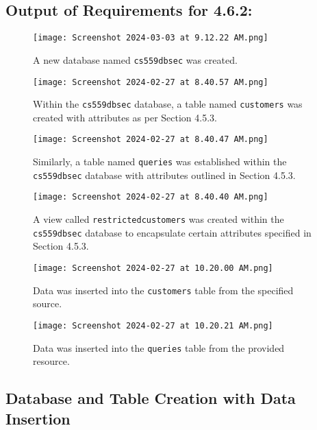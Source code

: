 \documentclass{article}
\begin{document}
\subsection*{Output of Requirements for 4.6.2:}

\begin{figure}[H]
    \centering
    \texttt{[image: Screenshot 2024-03-03 at 9.12.22 AM.png]}
    \caption{A new database named  \texttt{cs559dbsec} was created.}
\end{figure}

\begin{figure}[H]
    \centering
    \texttt{[image: Screenshot 2024-02-27 at 8.40.57 AM.png]}
    \caption{Within the \texttt{cs559dbsec} database, a table named \texttt{customers} was created with attributes as per Section 4.5.3.}
\end{figure}

\begin{figure}[H]
    \centering
    \texttt{[image: Screenshot 2024-02-27 at 8.40.47 AM.png]}
    \caption{Similarly, a table named \texttt{queries} was established within the \texttt{cs559dbsec} database with attributes outlined in Section 4.5.3.}
\end{figure}

\begin{figure}[H]
    \centering
    \texttt{[image: Screenshot 2024-02-27 at 8.40.40 AM.png]}
    \caption{A view called \texttt{restrictedcustomers} was created within the \texttt{cs559dbsec} database to encapsulate certain attributes specified in Section 4.5.3.}
\end{figure}

\begin{figure}[H]
    \centering
    \texttt{[image: Screenshot 2024-02-27 at 10.20.00 AM.png]}
    \caption{Data was inserted into the \texttt{customers} table from the specified source.}
\end{figure}

\begin{figure}[H]
    \centering
    \texttt{[image: Screenshot 2024-02-27 at 10.20.21 AM.png]}
    \caption{Data was inserted into the \texttt{queries} table from the provided resource.}
\end{figure}

%

\subsection*{Database and Table Creation with Data Insertion}
\end{document}
